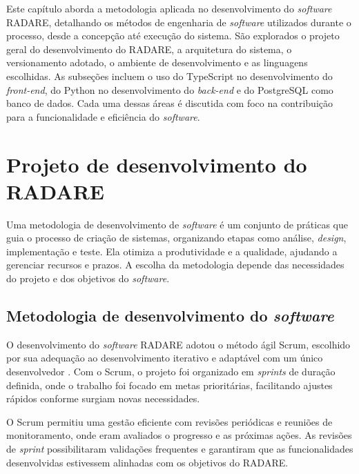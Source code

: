 \label{Cap:Metodologia}

Este capítulo aborda a metodologia aplicada no desenvolvimento do \textit{software} RADARE, detalhando os métodos de engenharia de \textit{software} utilizados durante o processo, desde a concepção até execução do sistema. São explorados o projeto geral do desenvolvimento do RADARE, a arquitetura do sistema, o versionamento adotado, o ambiente de desenvolvimento e as linguagens escolhidas. As subseções incluem o uso do TypeScript no desenvolvimento do \textit{front-end}, do Python no desenvolvimento do \textit{back-end} e do PostgreSQL como banco de dados. Cada uma dessas áreas é discutida com foco na contribuição para a funcionalidade e eficiência do \textit{software}.

\section{Projeto de desenvolvimento do RADARE}

Uma metodologia de desenvolvimento de \textit{software} é um conjunto de práticas que guia o processo de criação de sistemas, organizando etapas como análise, \textit{design}, implementação e teste. Ela otimiza a produtividade e a qualidade, ajudando a gerenciar recursos e prazos. A escolha da metodologia depende das necessidades do projeto e dos objetivos do \textit{software}.

\subsection{Metodologia de desenvolvimento do \textit{software}}

O desenvolvimento do \textit{software} RADARE adotou o método ágil Scrum, escolhido por sua adequação ao desenvolvimento iterativo e adaptável com um único desenvolvedor \cite{softwareengreq}. Com o Scrum, o projeto foi organizado em \textit{sprints} de duração definida, onde o trabalho foi focado em metas prioritárias, facilitando ajustes rápidos conforme surgiam novas necessidades.

O Scrum permitiu uma gestão eficiente com revisões periódicas e reuniões de monitoramento, onde eram avaliados o progresso e as próximas ações. As revisões de \textit{sprint} possibilitaram validações frequentes e garantiram que as funcionalidades desenvolvidas estivessem alinhadas com os objetivos do RADARE. 

